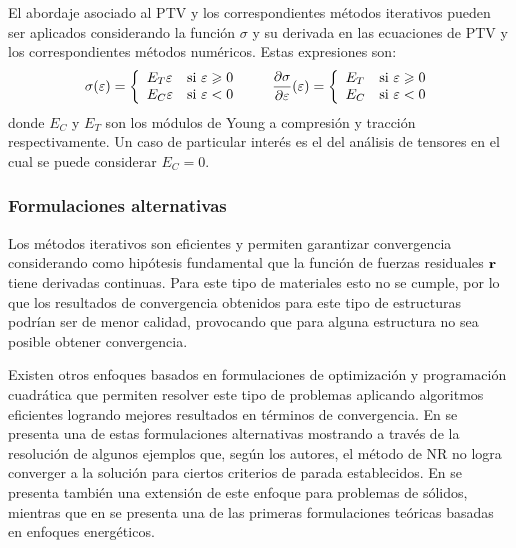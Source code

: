 El abordaje asociado al PTV y los correspondientes métodos iterativos pueden ser aplicados considerando la función $\sigma$ y su derivada en las ecuaciones de PTV y los correspondientes métodos numéricos. Estas expresiones son: %
%
\begin{equation}
\sigma (\varepsilon) = 
\left\{
\begin{array}{lr}
E_T \varepsilon & \text{si } \varepsilon \geqslant 0 \\
E_C \varepsilon & \text{si }\varepsilon <0
\end{array}
\right.
\qquad
\frac{\partial \sigma}{\partial \varepsilon} (\varepsilon) = 
\left\{
\begin{array}{lr}
E_T & \text{si }\varepsilon \geqslant 0 \\
E_C & \text{si }\varepsilon < 0
\end{array}
\right.
\end{equation}
%
donde $E_C$ y $E_T$ son los módulos de Young a compresión y tracción respectivamente.
%
Un caso de particular interés es el del análisis de tensores en el cual se puede considerar $E_C=0$.



\subsubsection{Formulaciones alternativas}

Los métodos iterativos son eficientes y permiten garantizar convergencia considerando como hipótesis fundamental que la función de fuerzas residuales ${\bf r}$ tiene derivadas continuas. %
%
Para este tipo de materiales esto no se cumple, por lo que los resultados de convergencia obtenidos para este tipo de estructuras podrían ser de menor calidad, provocando que para alguna estructura no sea posible obtener convergencia.

Existen otros enfoques basados en formulaciones de optimización y programación cuadrática que permiten resolver este tipo de problemas aplicando algoritmos eficientes logrando mejores resultados en términos de convergencia. %
%
En \citep{Zhang2013} se presenta una de estas formulaciones alternativas mostrando a través de la resolución de algunos ejemplos que, según los autores, el método de NR no logra converger a la solución para ciertos criterios de parada establecidos. %
%
En \citep{Zhang2016a} se presenta también una extensión de este enfoque para problemas de sólidos, mientras que en \citep{Du2014} se presenta una de las primeras formulaciones teóricas basadas en enfoques energéticos.


